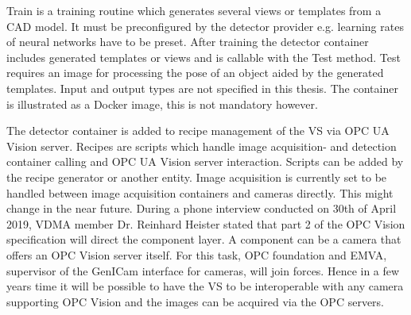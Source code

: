 Train is a training routine which generates several views or templates from a CAD model. It must be preconfigured by the detector provider e.g. learning rates of neural networks have to be preset. After training the detector container includes generated templates or views and is callable with the Test method.  Test requires an image for processing the pose of an object aided by the generated templates.  Input and output types are not specified in this thesis. The container is illustrated as a Docker image, this is not mandatory however. 

The detector container is added to recipe management of the VS via OPC UA Vision server. Recipes are scripts which handle image acquisition- and detection container calling and OPC UA Vision server interaction. Scripts can be added by the recipe generator or another entity. Image acquisition is currently set to be handled between image acquisition containers and cameras directly. This might change in the near future. During a phone interview conducted on 30th of April 2019, VDMA member Dr. Reinhard Heister stated that part 2 of the OPC Vision specification will direct the component layer. A component can be a camera that offers an OPC Vision server itself. For this task, OPC foundation and EMVA, supervisor of the GenICam interface \cite{LastvisitedMay4th20192019GenICamStandard} for cameras, will join forces. Hence in a few years time it will be possible to have the VS to be interoperable with any camera supporting OPC Vision and the images can be acquired via the OPC servers.


